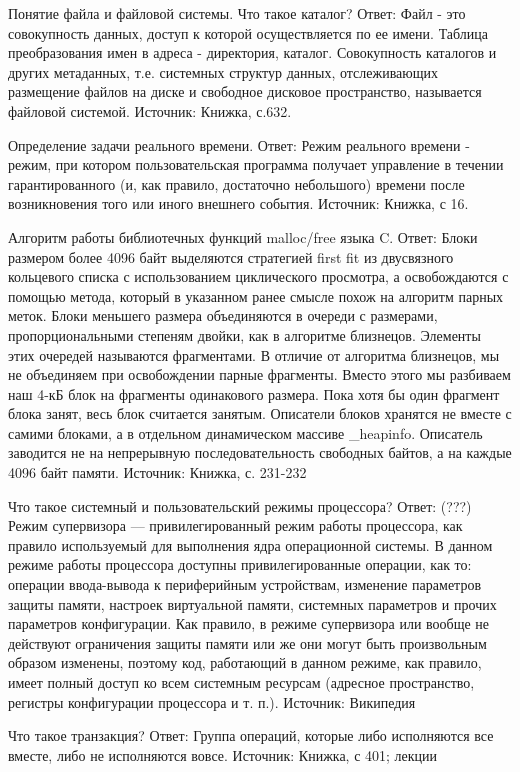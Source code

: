\documentclass[russian,twocolumn]{article}
\begin{document}
Понятие файла и файловой системы. Что такое каталог?
Ответ: 
Файл - это совокупность данных, доступ к которой осуществляется по ее имени. 
Таблица преобразования имен в адреса - директория, каталог. 
Совокупность каталогов и других метаданных, т.е. системных структур данных, отслеживающих размещение файлов на диске и свободное дисковое пространство, называется файловой системой. 
Источник: 
Книжка, с.632. 

Определение задачи реального времени.
Ответ: 
Режим реального времени - режим, при котором пользовательская программа получает управление в течении гарантированного (и, как правило, достаточно небольшого) времени после возникновения того или иного внешнего события. 
Источник: 
Книжка, с 16. 

Алгоритм работы библиотечных функций malloc/free языка C.
Ответ: 
Блоки размером более 4096 байт выделяются стратегией first fit из двусвязного кольцевого списка с использованием циклического просмотра, а освобождаются с помощью метода, который в указанном ранее смысле похож на алгоритм парных меток. Блоки меньшего размера объединяются в очереди с размерами, пропорциональными степеням двойки, как в алгоритме близнецов. Элементы этих очередей называются фрагментами. В отличие от алгоритма близнецов, мы не объединяем при освобождении парные фрагменты. Вместо этого мы разбиваем наш 4-кБ блок на фрагменты одинакового размера. Пока хотя бы один фрагмент блока занят, весь блок считается занятым. 
Описатели блоков хранятся не вместе с самими блоками, а в отдельном динамическом массиве _heapinfo. Описатель заводится не на непрерывную последовательность свободных байтов, а на каждые 4096 байт памяти. 
Источник: 
Книжка, с. 231-232 

Что такое системный и пользовательский режимы процессора?
Ответ: 
(???) Режим супервизора — привилегированный режим работы процессора, как правило используемый для выполнения ядра операционной системы. 
В данном режиме работы процессора доступны привилегированные операции, как то: операции ввода-вывода к периферийным устройствам, изменение параметров защиты памяти, настроек виртуальной памяти, системных параметров и прочих параметров конфигурации. Как правило, в режиме супервизора или вообще не действуют ограничения защиты памяти или же они могут быть произвольным образом изменены, поэтому код, работающий в данном режиме, как правило, имеет полный доступ ко всем системным ресурсам (адресное пространство, регистры конфигурации процессора и т. п.). 
Источник: 
Википедия 

Что такое транзакция?
Ответ: 
Группа операций, которые либо исполняются все вместе, либо не исполняются вовсе. 
Источник: 
Книжка, с 401; лекции 
\end{document}
